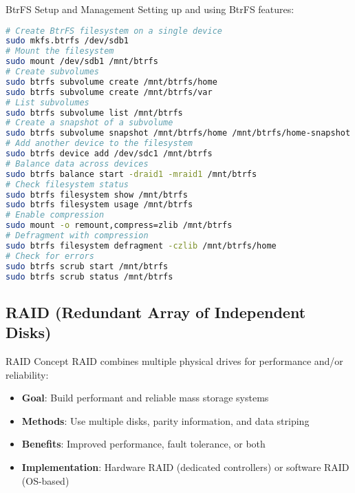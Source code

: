 \begin{example2}{BtrFS Setup and Management}
    Setting up and using BtrFS features:
    
\begin{lstlisting}[language=bash, style=basesmol]
# Create BtrFS filesystem on a single device
sudo mkfs.btrfs /dev/sdb1
# Mount the filesystem
sudo mount /dev/sdb1 /mnt/btrfs
# Create subvolumes
sudo btrfs subvolume create /mnt/btrfs/home
sudo btrfs subvolume create /mnt/btrfs/var
# List subvolumes
sudo btrfs subvolume list /mnt/btrfs
# Create a snapshot of a subvolume
sudo btrfs subvolume snapshot /mnt/btrfs/home /mnt/btrfs/home-snapshot
# Add another device to the filesystem
sudo btrfs device add /dev/sdc1 /mnt/btrfs
# Balance data across devices
sudo btrfs balance start -draid1 -mraid1 /mnt/btrfs
# Check filesystem status
sudo btrfs filesystem show /mnt/btrfs
sudo btrfs filesystem usage /mnt/btrfs
# Enable compression
sudo mount -o remount,compress=zlib /mnt/btrfs
# Defragment with compression
sudo btrfs filesystem defragment -czlib /mnt/btrfs/home
# Check for errors
sudo btrfs scrub start /mnt/btrfs
sudo btrfs scrub status /mnt/btrfs
\end{lstlisting}
\end{example2}



\subsection{RAID (Redundant Array of Independent Disks)}

\begin{concept}{RAID Concept}
    RAID combines multiple physical drives for performance and/or reliability:
    \begin{itemize}
        \item \textbf{Goal}: Build performant and reliable mass storage systems
        \item \textbf{Methods}: Use multiple disks, parity information, and data striping
        \item \textbf{Benefits}: Improved performance, fault tolerance, or both
        \item \textbf{Implementation}: Hardware RAID (dedicated controllers) or software RAID (OS-based)
    \end{itemize}
\end{concept}

